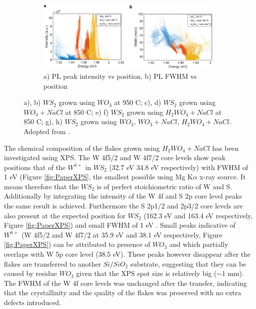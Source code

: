 \begin{figure}[!h]
\begin{center}
		\begin{subfigure}[b]{0.8\textwidth}
			\includegraphics[scale=0.3]{PaperSIScatterComparison.png}
			\caption{a) PL peak intensity vs position, b) PL FWHM vs position}
			\label{fig:PaperSIScatterComparison}
		\end{subfigure}
		\caption{a), b) $WS_2$ grown using $WO_3$ at 950 {\degree}C; c), d) $WS_2$ grown using $WO_3+NaCl$ at 850 {\degree}C; e) f) $WS_2$ grown using $H_2WO_4+NaCl$ at 850 {\degree}C; g), h) $WS_2$ grown using $WO_3$, $WO_3+NaCl$, $H_2WO_4+NaCl$. Adopted from \cite{Reale2017}.}
	\end{center}
\end{figure}

The chemical composition of the flakes grown using $H_2WO_4 + NaCl$ has been investigated using XPS. The W 4f5/2 and W 4f7/2 core levels show peak positions that of the $W^{4+}$ in $WS_2$ \cite{Cattelan2015}\cite{Martinez2004} (32.7 eV 34.8 eV respectively) with FWHM of 1 eV (Figure \ref{fig:PaperXPS}, the smallest possible using Mg K$\alpha$ x-ray source. It means therefore that the $WS_2$ is of perfect stoichiometric ratio of W and S. Additionally by integrating the intensity of the W 4f and S 2p core level peaks the same result is achieved. Furthermore the S 2p1/2 and 2p3/2 core levels are also present at the expected position for $WS_2$ (162.3 eV and 163.4 eV respectively, Figure \ref{fig:PaperXPS}) and small FWHM of 1 eV \cite{Martinez2004}. Small peaks indicative of $W^{6+}$ (W 4f5/2 and W 4f7/2 at 35.9 eV and 38.1 eV respectively, Figure \ref{fig:PaperXPS}) can be attributed to presence of $WO_3$ and which partially overlaps with W 5p core level (38.5 eV). These peaks however disappear after the flakes are transferred to another $Si/SiO_2$ substrate, suggesting that they can be caused by residue $WO_3$ given that the XPS spot size is relatively big ({$\sim$}1 mm). The FWHM of the W 4f core levels was unchanged after the transfer, indicating that the crystallinity and the quality of the flakes was preserved with no extra defects introduced.

